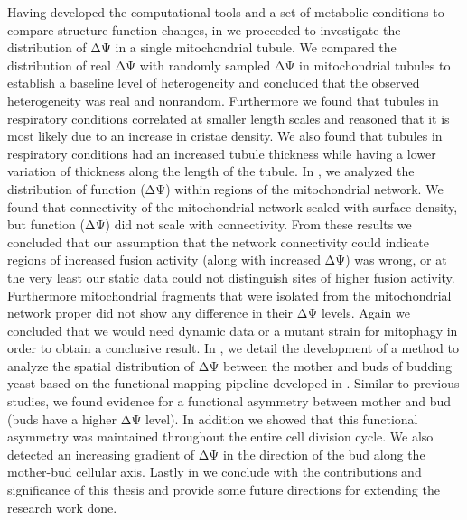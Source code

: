 Having developed the computational tools and a set of metabolic conditions to compare structure function changes, in  we proceeded to investigate the distribution of ΔΨ in a single mitochondrial tubule. We compared the distribution of real ΔΨ with randomly sampled ΔΨ in mitochondrial tubules to establish a baseline level of heterogeneity and concluded that the observed heterogeneity was real and nonrandom. Furthermore we found that tubules in respiratory conditions correlated at smaller length scales and reasoned that it is most likely due to an increase in cristae density. We also found that tubules in respiratory conditions had an increased tubule thickness while having a lower variation of thickness along the length of the tubule. In , we analyzed the distribution of function (ΔΨ) within regions of the mitochondrial network. We found that connectivity of the mitochondrial network scaled with surface density, but function (ΔΨ) did not scale with connectivity. From these results we concluded that our assumption that the network connectivity could indicate regions of increased fusion activity (along with increased ΔΨ) was wrong, or at the very least our static data could not distinguish sites of higher fusion activity. Furthermore mitochondrial fragments that were isolated from the mitochondrial network proper did not show any difference in their ΔΨ levels. Again we concluded that we would need dynamic data or a mutant strain for mitophagy in order to obtain a conclusive result. In , we detail the development of a method to analyze the spatial distribution of ΔΨ between the mother and buds of budding yeast based on the functional mapping pipeline developed in . Similar to previous studies, we found evidence for a functional asymmetry between mother and bud (buds have a higher ΔΨ level).  In addition we showed that this functional asymmetry was maintained throughout the entire cell division cycle. We also detected an increasing gradient of ΔΨ in the direction of the bud along the mother-bud cellular axis. Lastly in  we conclude with the contributions and significance of this thesis and provide some future directions for extending the research work done.




